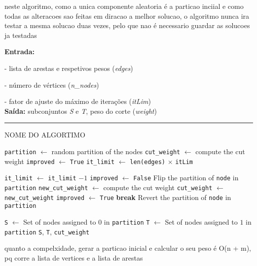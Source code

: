 \documentclass[mirror, portugues]{revdetua}
\begin{document}
neste algoritmo, como a unica componente aleatoria é a particao inciial e como todas as alteracoes sao feitas em diracao a melhor solucao, o algoritmo nunca ira testar a mesma solucao duas vezes, pelo que nao é necessario guardar as solucoes ja testadas

\begin{algorithm}[H]
\raggedright
\textbf{Entrada:}

- lista de arestas e respetivos pesos (\textit{edges})

- número de vértices (\textit{n\_nodes})

- fator de ajuste do máximo de iterações (\textit{itLim})\\
\textbf{Saída:} subconjuntos \textit{S} e \textit{T}, peso do corte (\textit{weight}) \\
\hrule 
\caption{NOME DO ALGORTIMO}
\begin{algorithmic}[1]
    \State \texttt{partition} $\gets$ random partition of the nodes
    \State \texttt{cut\_weight} $\gets$ compute the cut weight
    \State \texttt{improved} $\gets$ \texttt{True}
    \State \texttt{it\_limit} $\gets$ \texttt{len(edges)} \ensuremath{\times} \texttt{itLim}

        \State \texttt{it\_limit} $\gets$ \texttt{it\_limit} $ - 1$
        \State \texttt{improved} $\gets$ \texttt{False}
            \State Flip the partition of \texttt{node} in \texttt{partition}
            \State \texttt{new\_cut\_weight} $\gets$ compute the cut weight
                \State \texttt{cut\_weight} $\gets$ \texttt{new\_cut\_weight}
                \State \texttt{improved} $\gets$ \texttt{True}
                \State \textbf{break}  
            \EndIf
            \State Revert the partition of \texttt{node} in \texttt{partition}
        \EndFor
    \EndWhile

    \State \texttt{S} $\gets$ Set of nodes assigned to $0$ in \texttt{partition}
    \State \texttt{T} $\gets$ Set of nodes assigned to $1$ in \texttt{partition}
    \Return \texttt{S}, \texttt{T}, \texttt{cut\_weight}
\end{algorithmic}
\end{algorithm}
    
quanto a compelxidade, gerar a particao inicial e calcular o seu peso é O(n + m), pq corre a lista de vertices e a lista de arestas
\end{document}
